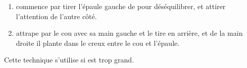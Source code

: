 \begin{technique}

\begin{enumerate}
	\item \A commence par tirer l'épaule gauche de \D pour déséquilibrer, et attirer l'attention de l'autre côté.
	
	\item \A attrape \D par le cou avec sa main gauche et le tire en arrière, et de la main droite il plante dans le creux entre le cou et l'épaule.
\end{enumerate}

Cette technique s'utilise si \D est trop grand.

\end{technique}
